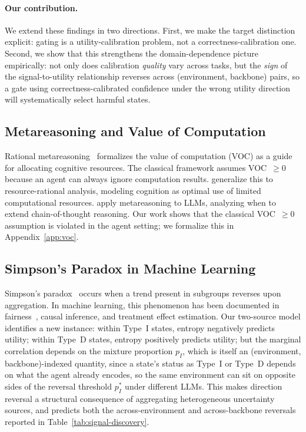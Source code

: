 \paragraph{Our contribution.}
We extend these findings in two directions. First, we make the
target distinction explicit: gating is a utility-calibration
problem, not a correctness-calibration one. Second, we show
that this strengthens the domain-dependence picture
empirically: not only does calibration \emph{quality} vary
across tasks, but the \emph{sign} of the signal-to-utility
relationship reverses across (environment, backbone) pairs, so
a gate using correctness-calibrated confidence under the wrong
utility direction will systematically select harmful states.

\subsection{Metareasoning and Value of Computation}

Rational metareasoning~\cite{russell1991right,
horvitz1987reasoning} formalizes the value of computation (VOC)
as a guide for allocating cognitive resources. The classical
framework assumes VOC~$\geq 0$ because an agent can always ignore
computation results. \citet{lieder2020resource} generalize this to
resource-rational analysis, modeling cognition as optimal use of
limited computational resources.
\citet{desabbata2024metareasoning} apply metareasoning to LLMs,
analyzing when to extend chain-of-thought reasoning.
Our work shows that the classical VOC~$\geq 0$ assumption is
violated in the agent setting; we formalize this in
Appendix~\ref{app:voc}.

\subsection{Simpson's Paradox in Machine Learning}
\label{app:simpson}

Simpson's paradox~\cite{simpson1951interpretation,
DBLP:books/acm/22/Pearl22n} occurs when a trend present in subgroups
reverses upon aggregation. In machine learning, this phenomenon has
been documented in fairness~\cite{kdd2023simpson}, causal
inference, and treatment effect estimation. Our two-source model
identifies a new instance: within Type~I states, entropy negatively
predicts utility; within Type~D states, entropy positively predicts
utility; but the marginal correlation depends on the mixture
proportion $p_I$, which is itself an (environment, backbone)-indexed
quantity, since a state's status as Type~I or Type~D depends on what the
agent already encodes, so the same environment can sit on opposite
sides of the reversal threshold $p_I^*$ under different LLMs. This
makes direction reversal a structural consequence of aggregating
heterogeneous uncertainty sources, and predicts both the
across-environment and across-backbone reversals reported in
Table~\ref{tab:signal-discovery}.

